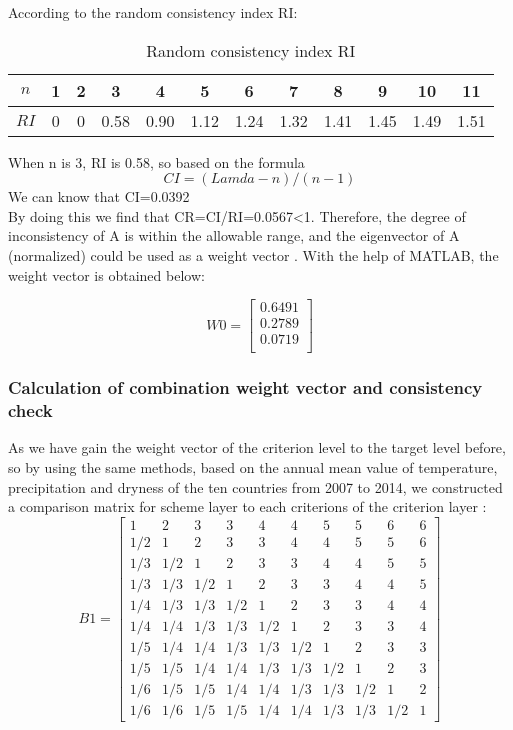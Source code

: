 \documentclass{mcmthesis}
\begin{document}
\quad According to the random consistency index RI:

\begin{table}[htbp]
\centering
\caption{Random consistency index RI}
\begin{tabular}{c|ccccccccccc}
\hline
$n$ & 1 & 2 & 3 & 4& 5& 6 & 7 & 8&9&10&11\\
\hline
$RI$  & 0 & 0 & 0.58 &0.90 &1.12 &1.24 &1.32 & 1.41 &1.45 &1.49 &1.51\\
\hline
\end{tabular}
\end{table}

When n is 3,  RI is 0.58, so based on the formula
\[CI = (Lamda - n)/(n - 1)\]
\quad We can know that CI=0.0392\\

\quad By doing this we find that CR=CI/RI=0.0567<1. Therefore, the degree of inconsistency of A is within the allowable range, and the eigenvector of A (normalized) could be used as a weight vector .
With the help of MATLAB, the weight vector is obtained below:

\begin{equation}
W0={
\left[ \begin{array}{c}
0.6491\\
0.2789\\
0.0719\\

\end{array} 
\right ]}
\end{equation}

\subsubsection{Calculation of combination weight vector and consistency check}
As we have gain the weight vector of the criterion level to the target level before, so by using the same methods,  based on the annual mean value of temperature, precipitation and dryness of the ten countries from 2007 to 2014, we constructed a comparison matrix for scheme layer to each criterions of the criterion layer : 
\begin{equation}
B1={
\left[ \begin{array}{cccccccccc} 
1 & 2 & 3 & 3 &4 &4 &5 &5 &6 &6 \\
1/2 & 1 & 2 & 3 & 3 & 4 & 4 & 5 & 5 &6 \\
1/3 & 1/2 & 1 &2 &3 &3 &4 &4 &5 &5 \\
1/3 & 1/3 & 1/2 & 1 & 2 & 3 & 3 & 4 &4 &5\\
1/4& 1/3& 1/3& 1/2 & 1 &2 &3 &3 &4 &4\\
1/4& 1/4& 1/3& 1/3& 1/2 & 1 &2 &3 &3 &4\\
1/5& 1/4& 1/4& 1/3& 1/3& 1/2 & 1 &2 &3 &3\\
1/5& 1/5& 1/4& 1/4& 1/3& 1/3& 1/2 & 1 &2 &3 \\
1/6& 1/5& 1/5& 1/4& 1/4& 1/3& 1/3 &1/2 &1 &2\\
1/6& 1/6& 1/5& 1/5& 1/4& 1/4& 1/3& 1/3& 1/2& 1
\end{array} 
\right ]}
\end{equation}
\end{document}
